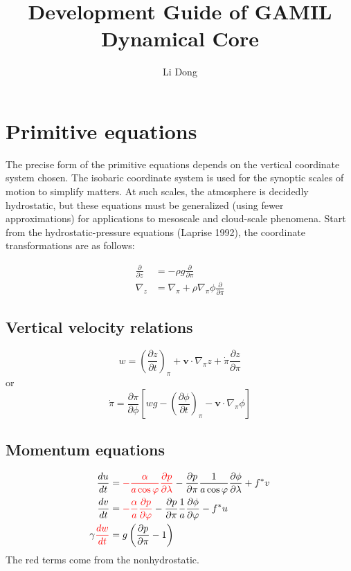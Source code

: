 \documentclass[12pt]{article}
\title{Development Guide of GAMIL Dynamical Core}
\author{Li Dong}
\renewcommand{\d}[2]{\frac{d #1}{d #2}}
\newcommand{\dt}[1]{\d{#1}{t}}
\newcommand{\pd}[2]{\frac{\partial #1}{\partial #2}}
\newcommand{\pdt}[1]{\pd{#1}{t}}
\newcommand{\pdx}[2][1]{\frac{#1}{a \cos{\varphi}} \pd{#2}{\lambda}}
\newcommand{\pdy}[2][1]{\frac{#1}{a} \pd{#2}{\varphi}}
\newcommand{\pdz}[1]{\pd{#1}{\pi}}
\renewcommand{\vec}[1]{\mathbf{#1}}
\begin{document}
\maketitle

\section{Primitive equations}

The precise form of the primitive equations depends on the vertical coordinate system chosen. The isobaric coordinate system is used for the synoptic scales of motion to simplify matters. At such scales, the atmosphere is decidedly hydrostatic, but these equations must be generalized (using fewer approximations) for applications to mesoscale and cloud-scale phenomena.
Start from the hydrostatic-pressure equations (Laprise 1992), the coordinate transformations are as follows:

\begin{align*}
  \pd{}{z} & = - \rho g \pd{}{\pi} \\
  \nabla_z & = \nabla_\pi + \rho \nabla_\pi \phi \pd{}{\pi}
\end{align*}

\subsection{Vertical velocity relations}

\begin{equation}
  w = \left(\pdt{z}\right)_\pi + \vec{v} \cdot \nabla_\pi z + \dot{\pi} \pdz{z}
  \label{eqn:vert-speed-relation1}
\end{equation}
or
\begin{equation}
  \dot{\pi} = \pd{\pi}{\phi} \left[w g - \left(\pdt{\phi}\right)_\pi - \vec{v} \cdot \nabla_\pi \phi\right]
  \label{eqn:vert-speed-relation2}
\end{equation}

\subsection{Momentum equations}

\begin{align*}
         \dt{u} & = {\color{red}- \pdx[\alpha]{p}} - \pd{p}{\pi} \pdx{\phi} + f^* v \\
         \dt{v} & = {\color{red}- \pdy[\alpha]{p}} - \pd{p}{\pi} \pdy{\phi} - f^* u \\
  \gamma {\color{red}\dt{w}} & =   g \left( \pd{p}{\pi} - 1 \right)
\end{align*}
The red terms come from the nonhydrostatic.
\end{document}
